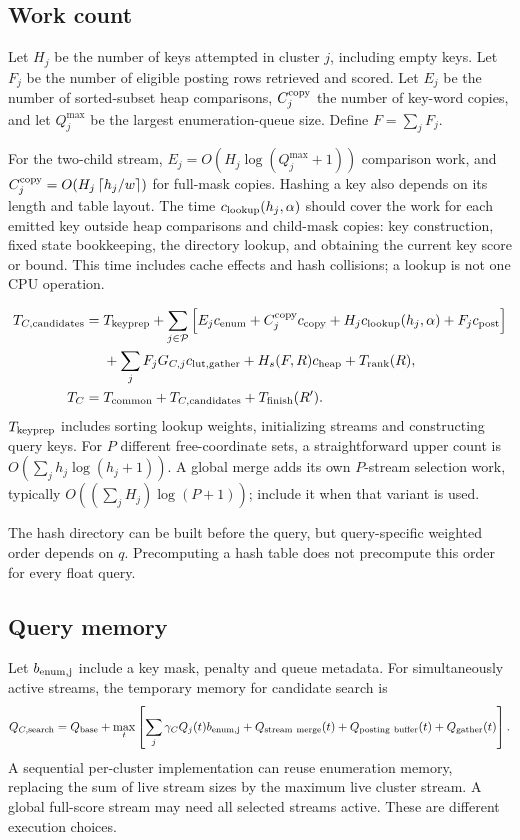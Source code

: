 \subsection{Work count}
Let $H_j$ be the number of keys attempted in cluster $j$, including empty keys. Let $F_j$ be
the number of eligible posting rows retrieved and scored. Let $E_j$ be the number of
sorted-subset heap comparisons, $C_j^{\rm copy}$ the number of key-word copies, and let
$Q_j^{\max}$ be the largest enumeration-queue size. Define $F=\sum_jF_j$.

For the two-child stream, $E_j=O(H_j\log(Q_j^{\max}+1))$ comparison work, and
$C_j^{\rm copy}=O(H_j\left\lceil h_j/w\right\rceil)$ for full-mask copies. Hashing a key also depends on its
length and table layout. The time $c_{\rm lookup}(h_j,\alpha)$ should cover the work for each emitted key outside heap comparisons and child-mask copies: key construction, fixed state bookkeeping, the directory lookup, and obtaining the current key score or bound. This time includes cache effects and hash collisions; a lookup is not one CPU operation.

\begin{align}
T_{C,\rm candidates}={}&T_{\rm keyprep}
 +\sum_{j\in\mathcal P}\Big[
 E_jc_{\rm enum}+C_j^{\rm copy}c_{\rm copy}
 +H_jc_{\rm lookup}(h_j,\alpha)+F_jc_{\rm post}\Big]\notag\\
 &+\sum_j F_jG_{C,j}c_{\rm lut,gather}+H_s(F,R)c_{\rm heap}+T_{\rm rank}(R),
\label{eq:keys-time}\\
T_C={}&T_{\mathrm{common}}+T_{C,\rm candidates}+T_{\mathrm{finish}}(R').
\label{eq:keys-total}
\end{align}
$T_{\rm keyprep}$ includes sorting lookup weights, initializing streams and constructing
query keys. For $P$ different free-coordinate sets, a straightforward upper count is
$O(\sum_jh_j\log(h_j+1))$. A global merge adds its own $P$-stream selection work, typically
$O((\sum_jH_j)\log(P+1))$; include it when that variant is used.

The hash directory can be built before the query, but query-specific weighted order depends
on $q$. Precomputing a hash table does not precompute this order for every float query.

\subsection{Query memory}
Let $b_{\rm enum,j}$ include a key mask, penalty and queue metadata. For simultaneously active
streams, the temporary memory for candidate search is
\begin{equation}
Q_{C,\rm search}=Q_{\mathrm{base}}+
 \max_t\left[\sum_j\gamma_C Q_j(t)b_{\rm enum,j}
             +Q_{\rm stream\ merge}(t)+Q_{\rm posting\ buffer}(t)
             +Q_{\rm gather}(t)\right].
\label{eq:keys-ram}
\end{equation}
A sequential per-cluster implementation can reuse enumeration memory, replacing the sum of
live stream sizes by the maximum live cluster stream. A global full-score stream may need
all selected streams active. These are different execution choices.

